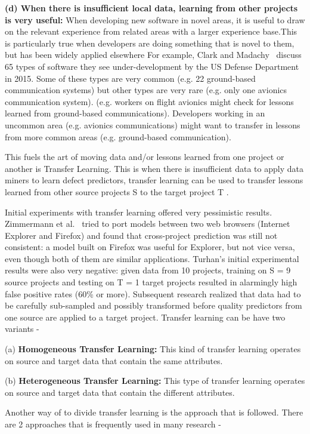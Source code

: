 \documentclass[10pt,journal,compsoc]{IEEEtran}
\begin{document}
\textbf{(d) When there is insufficient local data, learning from other projects is very useful:} When developing new software in  novel areas, it is useful to draw on the relevant  experience  from related areas with a larger experience base.This is particularly true when developers are doing something that is novel to them, but has been widely applied elsewhere
For example, Clark and Madachy~\cite{clark15} discuss 65 types of software they see        under-development by the US Defense Department in 2015.   Some of these types are very common (e.g. 22 ground-based communication systems) but other types are very rare (e.g. only  one avionics communication system). (e.g. workers on   flight avionics   might check for lessons learned from ground-based communications). Developers  working in an uncommon area (e.g. avionics communications) might want to transfer in lessons from more common areas (e.g. ground-based communication).


This fuels the art of moving data and/or lessons learned from one project or another is Transfer Learning. This is when there is insufficient data to apply data miners to learn defect predictors, transfer learning can be used to transfer lessons learned from other source projects S to the target project T .

Initial experiments with transfer learning offered very pessimistic results. Zimmermann et al.~\cite{zimmermann2009cross} tried to port models between two web browsers (Internet Explorer and Firefox) and found that cross-project prediction was still not consistent: a model built on Firefox was useful for Explorer, but not vice versa, even though both of them are similar applications. Turhan's initial experimental results were also very negative: given data from 10 projects, training on S = 9 source projects and testing on T = 1 target projects resulted in alarmingly high false positive rates (60\% or more). Subsequent research realized that data had to be carefully sub-sampled and possibly transformed before quality predictors from one source are applied to a target project. Transfer learning can be have two variants - 

(a) \textbf{Homogeneous Transfer Learning:} This kind of transfer learning operates on source and target data that contain the same attributes.
    
(b) \textbf{Heterogeneous Transfer Learning:} This type of transfer learning operates on source and target data that contain the different attributes.


Another way of to divide transfer learning is the approach that is followed. There are  2 approaches that is frequently used in many research  - 
\end{document}
